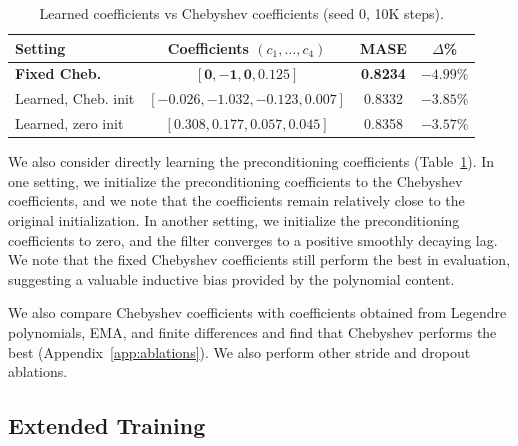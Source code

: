 \documentclass{article}
\begin{document}
\begin{table}[t]
\caption{Learned coefficients vs Chebyshev coefficients (seed 0, 10K steps).}
\label{tab:learned-coeff-main}
\vskip 0.05in
\centering
\begin{scriptsize}
\setlength{\tabcolsep}{2pt}
\begin{tabular}{@{}lccc@{}}
\toprule
\textbf{Setting} & \textbf{Coefficients $(c_1,\ldots,c_4)$} & \textbf{MASE} & \textbf{$\Delta$\%} \\
\midrule
\textbf{Fixed Cheb.} & $\mathbf{[0,-1,0,0.125]}$ & \textbf{0.8234} & $\mathbf{-4.99\%}$ \\
Learned, Cheb. init & $[-0.026,-1.032,-0.123,0.007]$ & 0.8332 & $-3.85\%$ \\
Learned, zero init & $[0.308,0.177,0.057,0.045]$ & 0.8358 & $-3.57\%$ \\
\bottomrule
\end{tabular}
\end{scriptsize}
\vskip -0.1in
\end{table}

We also consider directly learning the preconditioning coefficients (Table~\ref{tab:learned-coeff-main}). In one setting, we initialize the preconditioning coefficients to the Chebyshev coefficients, and we note that the coefficients remain relatively close to the original initialization. In another setting, we initialize the preconditioning coefficients to zero, and the filter converges to a positive smoothly decaying lag. We note that the fixed Chebyshev coefficients still perform the best in evaluation, suggesting a valuable inductive bias provided by the polynomial content.

We also compare Chebyshev coefficients with coefficients obtained from Legendre polynomials, EMA, and finite differences and find that Chebyshev performs the best (Appendix~\ref{app:ablations}). We also perform other stride and dropout ablations.

\subsection{Extended Training}
\end{document}
